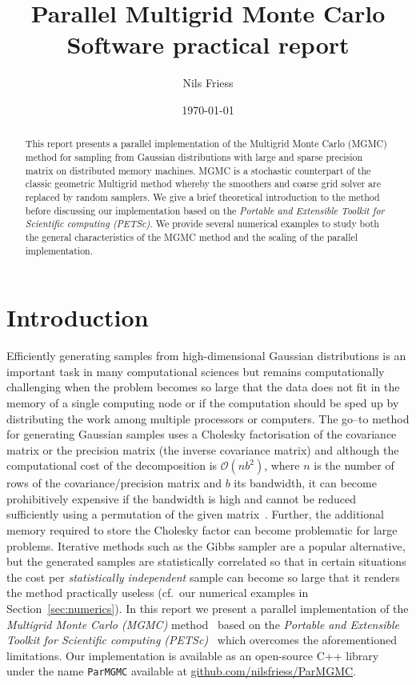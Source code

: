 \documentclass[
fontsize=11pt,
paper=a4,
numbers=noenddot
]{scrartcl}
\title{Parallel Multigrid Monte Carlo\\
{\normalsize Software practical report}}
\date{\today}
\author{Nils Friess}
\begin{document}
 
\maketitle

\begin{abstract}
    This report presents a parallel implementation of the Multigrid Monte Carlo (MGMC) method for sampling from Gaussian distributions with large and sparse precision matrix on distributed memory machines. MGMC is a stochastic counterpart of the classic geometric Multigrid method whereby the smoothers and coarse grid solver are replaced by random samplers. We give a brief theoretical introduction to the method before discussing our implementation based on the \emph{Portable and Extensible Toolkit for Scientific computing (PETSc)}. We provide several numerical examples to study both the general characteristics of the MGMC method and the scaling of the parallel implementation.
\end{abstract}

\section{Introduction}
Efficiently generating samples from high-dimensional Gaussian distributions is an important task in many computational sciences but remains computationally challenging when the problem becomes so large that the data does not fit in the memory of a single computing node or if the computation should be sped up by distributing the work among multiple processors or computers. The go--to method for generating Gaussian samples uses a Cholesky factorisation of the covariance matrix or the precision matrix (the inverse covariance matrix) and although the computational cost of the decomposition is $\mathcal{O}(nb^2)$, where $n$ is the number of rows of the covariance/precision matrix and $b$ its bandwidth, it can become prohibitively expensive if the bandwidth is high and cannot be reduced sufficiently using a permutation of the given matrix~\cite{golubvanloan,rue2001fast,foxparker}. Further, the additional memory required to store the Cholesky factor can become problematic for large problems. Iterative methods such as the Gibbs sampler are a popular alternative, but the generated samples are statistically correlated so that in certain situations the cost per \emph{statistically independent} sample can become so large that it renders the method practically useless (cf.\ our numerical examples in Section~\ref{sec:numerics}). In this report we present a parallel implementation of the \emph{Multigrid Monte Carlo (MGMC)} method~\cite{goodmansokal} based on the \emph{Portable and Extensible  Toolkit for Scientific computing (PETSc)}~\cite{petsc-web-page,petsc-user-ref} which overcomes the aforementioned limitations. Our implementation is available as an open-source C++ library under the name \texttt{ParMGMC} available at \url{github.com/nilsfriess/ParMGMC}.
\end{document}
